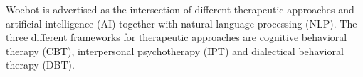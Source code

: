 Woebot is advertised as the intersection of different therapeutic approaches and artificial intelligence (AI) together with natural language processing (NLP)\cite{woebot-powers}.
The three different frameworks for therapeutic approaches are cognitive behavioral therapy (CBT), interpersonal psychotherapy (IPT) and dialectical behavioral therapy (DBT).







